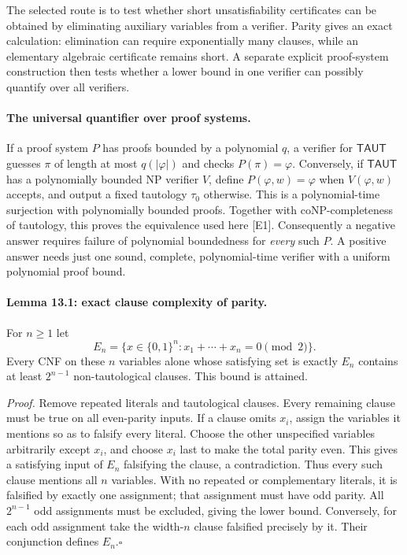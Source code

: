 \documentclass[11pt]{article}
\begin{document}
The selected route is to test whether short unsatisfiability certificates can
be obtained by eliminating auxiliary variables from a verifier. Parity gives
an exact calculation: elimination can require exponentially many clauses,
while an elementary algebraic certificate remains short. A separate explicit
proof-system construction then tests whether a lower bound in one verifier
can possibly quantify over all verifiers.

\paragraph{The universal quantifier over proof systems.}
If a proof system $P$ has proofs bounded by a polynomial $q$, a verifier for
$\mathsf{TAUT}$ guesses $\pi$ of length at most $q(|\varphi|)$ and checks
$P(\pi)=\varphi$. Conversely, if $\mathsf{TAUT}$ has a polynomially bounded
NP verifier $V$, define $P(\varphi,w)=\varphi$ when $V(\varphi,w)$ accepts,
and output a fixed tautology $\tau_0$ otherwise. This is a polynomial-time
surjection with polynomially bounded proofs. Together with coNP-completeness
of tautology, this proves the equivalence used here [E1]. Consequently a
negative answer requires failure of polynomial boundedness for \emph{every}
such $P$. A positive answer needs just one sound, complete, polynomial-time
verifier with a uniform polynomial proof bound.

\paragraph{Lemma 13.1: exact clause complexity of parity.}
For $n\ge1$ let
\[
 E_n=\{x\in\{0,1\}^n:x_1+\cdots+x_n=0\pmod2\}.
\]
Every CNF on these $n$ variables alone whose satisfying set is exactly $E_n$
contains at least $2^{n-1}$ non-tautological clauses. This bound is attained.

\emph{Proof.} Remove repeated literals and tautological clauses. Every
remaining clause must be true on all even-parity inputs. If a clause omits
$x_i$, assign the variables it mentions so as to falsify every literal.
Choose the other unspecified variables arbitrarily except $x_i$, and choose
$x_i$ last to make the total parity even. This gives a satisfying input of
$E_n$ falsifying the clause, a contradiction. Thus every such clause mentions
all $n$ variables. With no repeated or complementary literals, it is falsified
by exactly one assignment; that assignment must have odd parity. All
$2^{n-1}$ odd assignments must be excluded, giving the lower bound.
Conversely, for each odd assignment take the width-$n$ clause falsified
precisely by it. Their conjunction defines $E_n$.\hfill$\square$
\end{document}
